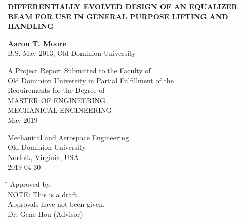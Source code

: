 \begin{titlepage}
   \begin{center}
       \vspace*{1cm}
       
       \Large
	   {\uppercase{\textbf{Differentially Evolved design of an Equalizer Beam for use in General Purpose Lifting and Handling}}\par}
       \normalsize

       \vspace{2.5cm}
 
       \textbf{Aaron T. Moore}\\
       B.S. May 2013, Old Dominion University
 
       \vfill
 
       A Project Report Submitted to the Faculty of\\
       Old Dominion University in Partial Fulfillment of the\\
       Requirements for the Degree of\\
       \vspace{1.0cm}
       \uppercase{Master of Engineering}\\
       \vspace{1em}
       \uppercase{Mechanical Engineering}\\
       \vspace{1em}
       {May 2019}\\

 
       \vspace{0.8cm}
 
 
       Mechanical  and Aerospace Engineering\\
       Old Dominion University\\
       Norfolk, Virginia, USA\\
       2019-04-30
 
   \end{center}
   \vspace{1cm}
   \begin{tabbing}
      \hspace*{11cm}\= \kill
      \>Approved by:\\
      \>NOTE: This is a draft.\\
      \>Approvals have not been given.\\
      \>Dr. Gene Hou (Advisor)
   \end{tabbing}
\end{titlepage}
